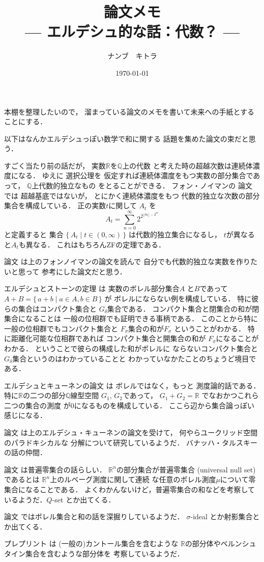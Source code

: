 \documentclass[leqno, a4paper, 12pt]{jsarticle}
\title{論文メモ
\large{\\--- エルデシュ的な話：代数？ ---}
}
\author{ナンブ　キトラ}
\date{\today}
\newcommand{\qq}{\mathbb{Q}}
\newcommand{\rr}{\mathbb{R}}
\begin{document}
\maketitle

本棚を整理したいので，
溜まっている論文のメモを書いて未来への手紙とすることにする．

以下はなんかエルデシュっぽい数学で和に関する
話題を集めた論文の束だと思う．

すごく当たり前の話だが，
実数$\rr$を$\qq$上の代数
と考えた時の超越次数は連続体濃度になる．
ゆえに
選択公理を
仮定すれば連続体濃度をもつ実数の部分集合であって，
$\qq$上代数的独立なもの
をとることができる．
フォン・ノイマンの
論文
\cite{MR1512442}
では
超越基底ではないが，
とにかく連続体濃度をもつ
代数的独立な次数の部分集合を構成している．
正の実数$t$に関して
$A_{t}$
を
\[
A_{t}=\sum_{n=0}^{\infty}2^{2^{\lfloor tn \rfloor -2^{n^{2}}}}
\]
と定義すると
集合
$\{\, A_{t}\mid t\in (0, \infty)\, \}$
は代数的独立集合になるし，
$t$が異なると$A_{t}$も異なる．
これはもちろんZFの定理である．

論文
\cite{MR0983806}
は上のフォンノイマンの論文を読んで
自分でも代数的独立な実数を作りたいと思って
参考にした論文だと思う．


エルデシュとストーンの定理
\cite{MR0260958}
は
実数のボレル部分集合$A$
と$B$であって
$A+B=\{\, a+b\mid a\in A, b\in B\, \}$
が
ボレルにならない例を構成している．
特に彼らの集合はコンパクト集合と
$G_{\delta}$集合である．
コンパクト集合と閉集合の和が閉集合になることは
一般の位相群でも証明できる事柄である．
このことから特に一般の位相群でもコンパクト集合と
$F_{\sigma}$集合の和が$F_{\sigma}$
ということがわかる．
特に距離化可能な位相群であれば
コンパクト集合と開集合の和が
$F_{\sigma}$になることがわかる．
ということで彼らの構成した和がボレルに
ならないコンパクト集合と
$G_{\delta}$集合というのはわかっていることと
わかっていなかたことのちょうど境目である．

エルデシュとキューネンの論文
\cite{MR0641304}
は
ボレルではなく，もっと
測度論的話である．
特に$\rr$の二つの部分$\qq$線型空間
$G_{1}$, 
$G_{2}$であって，
$G_{1}+G_{2}=\rr$
でなおかつこれら二つの集合の測度
が$0$になるものを構成している．
ここら辺から集合論っぽい感じになる．

論文
\cite{MR1149411}
は上のエルデシュ・キューネンの論文を受けて，
何やらユークリッド空間のパラドキシカルな
分解について研究しているようだ．
バナッハ・タルスキーの話の仲間．


論文
\cite{MR1142923}
は普遍零集合の話らしい．
$\rr^{n}$の部分集合が普遍零集合
(universal null set)
であるとは
$\rr^{n}$上のルベーグ測度に関して連続
な任意のボレル測度$\mu$について零集合になることである．
よくわかんないけど，普遍零集合の和などを考察しているようだ．$Q$-set とか出てくる．


論文
\cite{MR2010332}
ではボレル集合と和の話を深掘りしているようだ．
$\sigma$-ideal
とか射影集合とか出てくる．

プレプリント
\cite{kuba2020cantor}
は
(一般の)カントール集合を含むような
$\rr$の部分体やベルンシュタイン集合を含むような部分体を
考察しているようだ．
\nocite{*}


\end{document}
